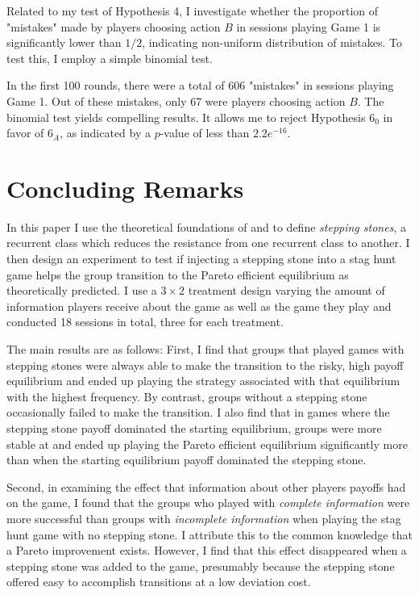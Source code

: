 Related to my test of Hypothesis 4, I investigate whether the proportion of "mistakes" made by players choosing action $B$ in sessions playing Game 1 is significantly lower than $1/2$, indicating non-uniform distribution of mistakes. To test this, I employ a simple binomial test.

In the first 100 rounds, there were a total of 606 "mistakes" in sessions playing Game 1. Out of these mistakes, only 67 were players choosing action $B$. The binomial test yields compelling results. It allows me to reject Hypothesis $6_0$ in favor of $6_A$, as indicated by a $p$-value of less than $2.2e^{-16}$.

\section{Concluding Remarks}

In this paper I use the theoretical foundations of \cite{young1993evolution} and \cite{ellison2000basins} to define \textit{stepping stones}, a recurrent class which reduces the resistance from one recurrent class to another. I then design an experiment to test if injecting a stepping stone into a stag hunt game helps the group transition to the Pareto efficient equilibrium as theoretically predicted. I use a $3 \times 2$ treatment design varying the amount of information players receive about the game as well as the game they play and conducted 18 sessions in total, three for each treatment. 

The main results are as follows: First, I find that groups that played games with stepping stones were always able to make the transition to the risky, high payoff equilibrium and ended up playing the strategy associated with that equilibrium with the highest frequency. By contrast, groups without a stepping stone occasionally failed to make the transition. I also find that in games where the stepping stone payoff dominated the starting equilibrium, groups were more stable at and ended up playing the Pareto efficient equilibrium significantly more than when the starting equilibrium payoff dominated the stepping stone. 

Second, in examining the effect that information about other players\textquotesingle{} payoffs had on the game, I found that the groups who played with \textit{complete information} were more successful than groups with \textit{incomplete information} when playing the stag hunt game with no stepping stone. I attribute this to the common knowledge that a Pareto improvement exists. However, I find that this effect disappeared when a stepping stone was added to the game, presumably because the stepping stone offered easy to accomplish transitions at a low deviation cost. 

